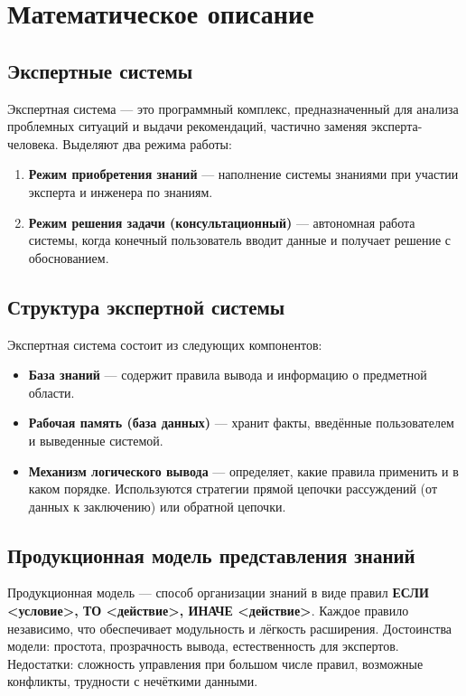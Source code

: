 \documentclass[a4paper, final]{extarticle}
\begin{document}
	
	
	\newpage

	
	\section{Математическое описание}
	
	\subsection{Экспертные системы}
	
	Экспертная система — это программный комплекс, предназначенный для анализа проблемных ситуаций и выдачи рекомендаций, частично заменяя эксперта-человека. Выделяют два режима работы:
	\begin{enumerate}
		\item \textbf{Режим приобретения знаний} — наполнение системы знаниями при участии эксперта и инженера по знаниям.
		\item \textbf{Режим решения задачи (консультационный)} — автономная работа системы, когда конечный пользователь вводит данные и получает решение с обоснованием.
	\end{enumerate}
	
	\subsection{Структура экспертной системы}
	
	Экспертная система состоит из следующих компонентов:
	\begin{itemize}
		\item \textbf{База знаний} — содержит правила вывода и информацию о предметной области.
		\item \textbf{Рабочая память (база данных)} — хранит факты, введённые пользователем и выведенные системой.
		\item \textbf{Механизм логического вывода} — определяет, какие правила применить и в каком порядке. Используются стратегии прямой цепочки рассуждений (от данных к заключению) или обратной цепочки.
	\end{itemize}
	
	\subsection{Продукционная модель представления знаний}
	
	Продукционная модель — способ организации знаний в виде правил \textbf{ЕСЛИ <условие>, ТО <действие>, ИНАЧЕ <действие>}. Каждое правило независимо, что обеспечивает модульность и лёгкость расширения. Достоинства модели: простота, прозрачность вывода, естественность для экспертов. Недостатки: сложность управления при большом числе правил, возможные конфликты, трудности с нечёткими данными.
	
\end{document}
